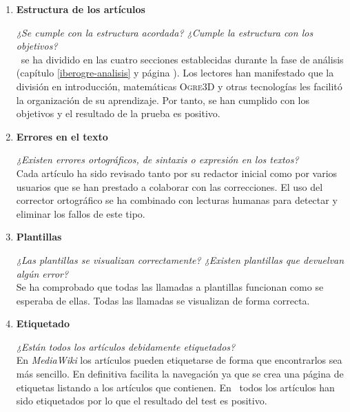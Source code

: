 \begin{enumerate}
    \itemsep0em
    \item \textbf{Estructura de los artículos}
    
    \textit{¿Se cumple con la estructura acordada? ¿Cumple la estructura
    con los objetivos?}\\
    
    \wiki\ se ha dividido en las cuatro secciones establecidas durante la
    fase de análisis (capítulo \ref{iberogre-analisis} y página \pageref{iberogre-analisis}).
    Los lectores han manifestado que la división en introducción, matemáticas
    \textsc{Ogre3D} y otras tecnologías les facilitó la organización
    de su aprendizaje. Por tanto, se han cumplido con los objetivos y el
    resultado de la prueba es positivo.\\
    
    \item \textbf{Errores en el texto}
    
    \textit{¿Existen errores ortográficos, de sintaxis o expresión en los
    textos?}\\
    
    Cada artículo ha sido revisado tanto por su redactor inicial como por
    varios usuarios que se han prestado a colaborar con las correcciones.
    El uso del corrector ortográfico se ha combinado con lecturas humanas
    para detectar y eliminar los fallos de este tipo.\\
    
    \item \textbf{Plantillas}
    
    \textit{¿Las plantillas se visualizan correctamente? ¿Existen plantillas
    que devuelvan algún error?}\\
    
    Se ha comprobado que todas las llamadas a plantillas funcionan como
    se esperaba de ellas. Todas las llamadas se visualizan de forma correcta.\\
    
    \item \textbf{Etiquetado}
    
    \textit{¿Están todos los artículos debidamente etiquetados?}\\
    
    En \textit{MediaWiki} los artículos pueden etiquetarse de forma que
    encontrarlos sea más sencillo. En definitiva facilita la navegación
    ya que se crea una página de etiquetas listando a los artículos
    que contienen. En \wiki\ todos los artículos han sido etiquetados
    por lo que el resultado del test es positivo.\\
    

\end{enumerate}
